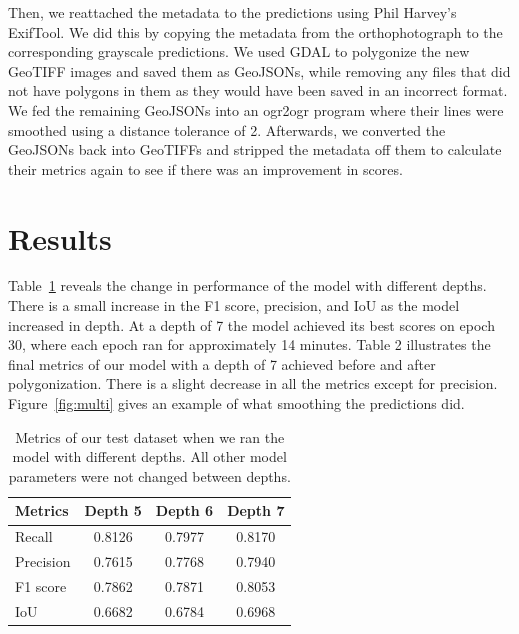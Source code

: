 \documentclass[acmtog, authorversion]{acmart}
\begin{document}
Then, we reattached the metadata to the predictions using Phil Harvey’s ExifTool\cite{Harvey2019}. We did this by copying the metadata from the orthophotograph to the corresponding grayscale predictions. We used GDAL to polygonize the new GeoTIFF images and saved them as GeoJSONs, while removing any files that did not have polygons in them as they would have been saved in an incorrect format. We fed the remaining GeoJSONs into an ogr2ogr program where their lines were smoothed using a distance tolerance of 2. Afterwards, we converted the GeoJSONs back into GeoTIFFs and stripped the metadata off them to calculate their metrics again to see if there was an improvement in scores.

\section{Results}
 Table~\ref{tab:depths} reveals the change in performance of the model with different depths. There is a small increase in the F1 score, precision, and IoU as the model increased in depth. At a depth of 7 the model achieved its best scores on epoch 30, where each epoch ran for approximately 14 minutes. Table 2 illustrates the final metrics of our model with a depth of 7 achieved before and after polygonization. There is a slight decrease in all the metrics except for precision. Figure~\ref{fig:multi} gives an example of what smoothing the predictions did.

\begin{table}
    \caption{Metrics of our test dataset when we ran the model with different depths. All other model parameters were not changed between depths.}
    \label{tab:depths}
    \begin{tabular}{l|c|c|c}
        \toprule
        Metrics & Depth 5 & Depth 6 & Depth 7\\
        \midrule
        Recall & 0.8126 & 0.7977 & 0.8170\\
        Precision & 0.7615 & 0.7768 & 0.7940\\
        F1 score & 0.7862 & 0.7871 & 0.8053\\
        IoU & 0.6682 & 0.6784 & 0.6968\\
        \bottomrule
    \end{tabular}
\end{table}
\end{document}
